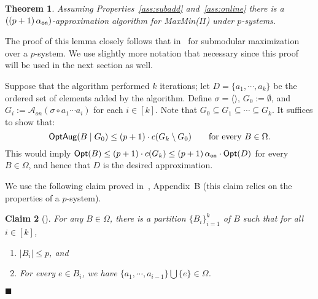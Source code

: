 \documentclass[11pt,letterpaper]{article}
\newtheorem{theorem}{Theorem}[section]
\newtheorem{claim}[theorem]{Claim}
\newenvironment{proof}{

\noindent{\bf Proof:}} {\hfill$\blacksquare$


}
\def\a{\ensuremath{\mathcal{A}}\xspace}
\def\opt{{\sf Opt}\xspace}
\def\cov{\ensuremath{\Pi}\xspace}
\def\mmp{{\sf MaxMin(\cov)}\xspace}
\newcommand{\sse}{\subseteq}
\newcommand{\online}{\alpha_{\sf on}}
\newcommand{\optaug}{{\sf OptAug}}
\begin{document}
\begin{theorem}\label{thm:maxmin-p-system}
Assuming Properties~\ref{ass:subadd} and~\ref{ass:online} there is a $\left((p+1)\, \online\right)$-approximation
algorithm for \mmp under $p$-systems.
\end{theorem}
\begin{proof}
The proof of this lemma closely follows that in~\cite{CCPV07} for submodular maximization over a $p$-system. We use
slightly more notation that necessary since this proof will be used in the next section as well.

Suppose that the algorithm performed $k$ iterations; let $D=\{a_1,\cdots,a_k\}$ be the ordered set of elements added by
the algorithm. Define $\sigma=\langle\rangle$, $G_0:=\emptyset$, and $G_i:=\a_{on}(\sigma \circ a_1\cdots a_i)$ for
each $i\in[k]$. Note that $G_0\sse G_1\sse\cdots\sse G_k$. It suffices to show that:
\begin{equation}\label{eq:max-min-psystem} \optaug(B\mid G_0)\le (p+1)\cdot c(G_k\setminus G_0) \qquad  \mbox{for every
 } B\in\Omega.\end{equation} This would imply $\opt(B)\le (p+1)\cdot c(G_k)\le (p+1)\,\online \cdot \opt(D)$ for every
$B\in\Omega$, and hence that $D$ is the desired approximation.


We use the following claim proved in~\cite{CCPV07}, Appendix~B (this claim relies on the properties of a $p$-system).

\begin{claim}[\cite{CCPV07}]\label{cl:ccpv}
For any $B\in \Omega$, there is a partition $\{B_i\}_{i=1}^k$ of $B$ such that for all $i\in[k]$,
\begin{enumerate}
 \item $|B_i|\le p$, and
 \item For every $e\in B_i$, we have $\{a_1,\cdots,a_{i-1}\}\bigcup \{e\} \in \Omega$.
\end{enumerate}
\end{claim}


\end{proof}
\end{document}
